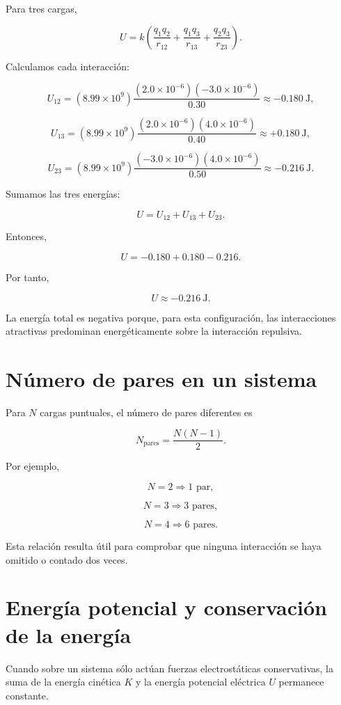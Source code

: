 Para tres cargas,

\[
U
=
k
\left(
\frac{q_1q_2}{r_{12}}
+
\frac{q_1q_3}{r_{13}}
+
\frac{q_2q_3}{r_{23}}
\right).
\]

Calculamos cada interacción:

\[
U_{12}
=
(8.99\times10^9)
\frac{(2.0\times10^{-6})(-3.0\times10^{-6})}{0.30}
\approx-\SI{0.180}{\joule},
\]

\[
U_{13}
=
(8.99\times10^9)
\frac{(2.0\times10^{-6})(4.0\times10^{-6})}{0.40}
\approx+\SI{0.180}{\joule},
\]

\[
U_{23}
=
(8.99\times10^9)
\frac{(-3.0\times10^{-6})(4.0\times10^{-6})}{0.50}
\approx-\SI{0.216}{\joule}.
\]

Sumamos las tres energías:

\[
U=U_{12}+U_{13}+U_{23}.
\]

Entonces,

\[
U=-0.180+0.180-0.216.
\]

Por tanto,

\[
\boxed{U\approx-\SI{0.216}{\joule}}.
\]

La energía total es negativa porque, para esta configuración, las interacciones
atractivas predominan energéticamente sobre la interacción repulsiva.


\section{Número de pares en un sistema}

Para \(N\) cargas puntuales, el número de pares diferentes es

\begin{equation}
\boxed{
N_{\text{pares}}
=
\frac{N(N-1)}{2}
}.
\label{eq:numero_pares}
\end{equation}

Por ejemplo,

\[
N=2\Longrightarrow1\text{ par},
\]

\[
N=3\Longrightarrow3\text{ pares},
\]

\[
N=4\Longrightarrow6\text{ pares}.
\]

Esta relación resulta útil para comprobar que ninguna interacción se haya omitido o
contado dos veces.


\section{Energía potencial y conservación de la energía}

Cuando sobre un sistema sólo actúan fuerzas electrostáticas conservativas, la suma de
la energía cinética \(K\) y la energía potencial eléctrica \(U\) permanece constante.

